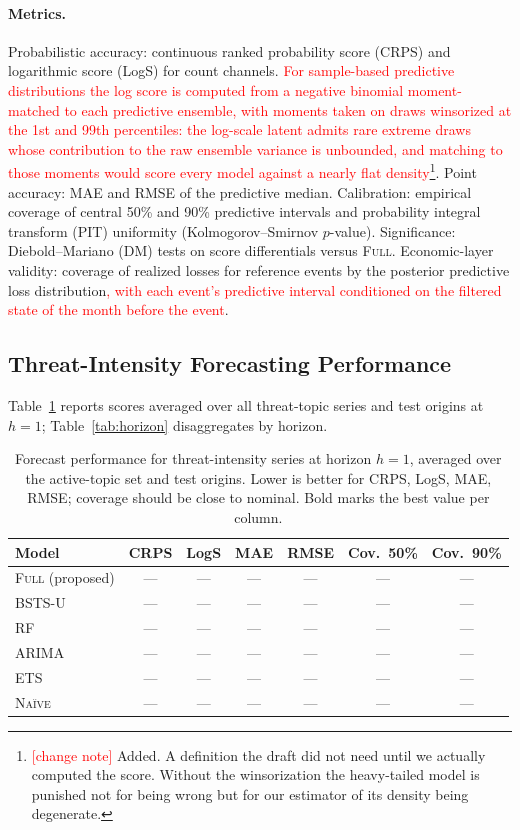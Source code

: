 \documentclass[review]{elsarticle}
\newcommand{\rev}[1]{\textcolor{red}{#1}}
\newcommand{\revnote}[2]{\textcolor{red}{#1}\footnote{\textcolor{red}{[change note]} #2}}
\newcommand{\rev}[1]{#1}
\newcommand{\revnote}[2]{#1}
\begin{document}
\paragraph{Metrics.}
Probabilistic accuracy: continuous ranked probability score (CRPS) and logarithmic score (LogS) for count channels. \revnote{For sample-based predictive distributions the log score is computed from a negative binomial moment-matched to each predictive ensemble, with moments taken on draws winsorized at the 1st and 99th percentiles: the log-scale latent admits rare extreme draws whose contribution to the raw ensemble variance is unbounded, and matching to those moments would score every model against a nearly flat density}{Added. A definition the draft did not need until we actually computed the score. Without the winsorization the heavy-tailed model is punished not for being wrong but for our estimator of its density being degenerate.}. Point accuracy: MAE and RMSE of the predictive median. Calibration: empirical coverage of central 50\% and 90\% predictive intervals and probability integral transform (PIT) uniformity (Kolmogorov--Smirnov $p$-value). Significance: Diebold--Mariano (DM) tests on score differentials versus \textsc{Full}. Economic-layer validity: coverage of realized losses for reference events by the posterior predictive loss distribution\rev{, with each event's predictive interval conditioned on the filtered state of the month before the event}.

\subsection{Threat-Intensity Forecasting Performance}

Table~\ref{tab:forecast} reports scores averaged over all threat-topic series and test origins at $h=1$; Table~\ref{tab:horizon} disaggregates by horizon.

\begin{table}
\centering
\caption{Forecast performance for threat-intensity series at horizon $h=1$, averaged over the active-topic set and test origins. Lower is better for CRPS, LogS, MAE, RMSE; coverage should be close to nominal. Bold marks the best value per column.}
\label{tab:forecast}
\small
\begin{tabular}{lcccccc}
\toprule
Model & CRPS & LogS & MAE & RMSE & Cov.\ 50\% & Cov.\ 90\% \\
\midrule
\textsc{Full} (proposed)        & --- & --- & --- & --- & --- & --- \\
\textsc{BSTS-U}                 & --- & --- & --- & --- & --- & --- \\
\textsc{RF} \citep{kia2024}     & --- & --- & --- & --- & --- & --- \\
\textsc{ARIMA}                  & --- & --- & --- & --- & --- & --- \\
\textsc{ETS}                    & --- & --- & --- & --- & --- & --- \\
\textsc{Na\"ive}                & --- & --- & --- & --- & --- & --- \\
\bottomrule
\end{tabular}
\end{table}
\end{document}
